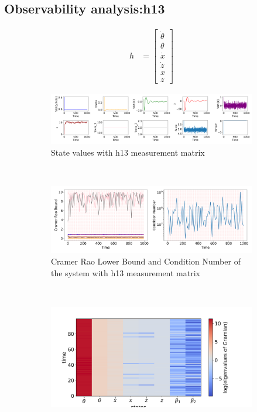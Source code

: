 \documentclass[12pt]{article}
\begin{document}
\subsection*{Observability analysis:h13}
\begin{align*}
    h &= \left[\begin{matrix}\dot{\theta}\\\theta\\\dot{x}\\\dot{z}\\x\\z\end{matrix}\right]
\end{align*}

\begin{figure}[H]
    \centering
    \begin{subfigure}[t]{\textwidth}
        \centering
        \includegraphics[width=15cm]{figures/states_with_noisy_sinusoidal_x_and_h13.png}
        \caption{State values with h13 measurement matrix}
        \label{supfig:09a}
    \end{subfigure}
    \\
    \begin{subfigure}[t]{\textwidth}
        \centering
        \includegraphics[width=15cm]{figures/crb_and_cn_with_noisy_sinusoidal_x_and_h13.png}
        \caption{Cramer Rao Lower Bound and Condition Number of the system with h13 measurement matrix}
        \label{supfig:09b}
    \end{subfigure}
    \\
    \begin{subfigure}[t]{\textwidth}
        \centering
        \includegraphics[width=15cm]{figures/gramian_eigenvalues_with_noisy_sinusoidal_x_and_h13.png}

\end{subfigure}
\end{figure}
\end{document}
